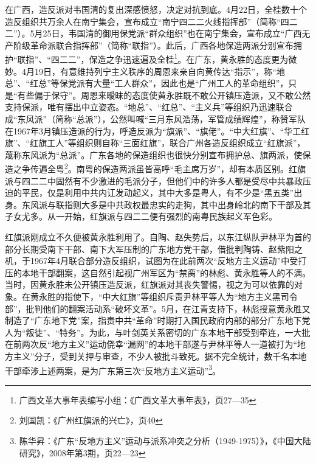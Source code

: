 在广西，造反派对韦国清的复出深感愤怒，决定对抗到底。4月22日，全桂数十个造反组织共万余人在南宁集会，宣布成立“南宁四二二火线指挥部”（简称“四二二”）。5月25日，韦国清的御用保党派“群众组织”也在南宁集会，宣布成立“广西无产阶级革命派联合指挥部”（简称“联指”）。此后，广西各地保造两派分别宣布拥护“联指”、“四二二”，保造之争迅速遍及全桂\footnote{广西文革大事年表编写小组：《广西文革大事年表》，页27—35}。在广东，黄永胜的态度更为微妙。4月19日，有意维持列宁主义秩序的周恩来亲自向黄传达“指示”，称“地总”、“红总”等保党派有大量“工人群众”，因此也是“广州工人的革命组织”，只是“有些偏于保守”。周恩来暧昧的态度使黄永胜既不敢公开镇压造派，又不敢公然支持保派，唯有摆出中立姿态。“地总”、“红总”、“主义兵”等组织乃迅速联合成“东风派”（简称“总派”），公然叫喊“三月东风浩荡，军管成绩辉煌”，称赞军队在1967年3月镇压造派的行为，呼造反派为“旗派”、“旗佬”。“中大红旗”、“华工红旗”、“红旗工人”等组织则自称“三面红旗”，联合广州各造反组织成立“红旗派”，蔑称东风派为“总派”。广东各地的保造组织也很快分别宣布拥护总、旗两派，使保造之争传遍全粤\footnote{刘国凯：《广州红旗派的兴亡》，页40}。南粤的保造两派虽皆高呼“毛主席万岁”，却有本质区别。红旗派与四二二中固然有不少激进的毛派分子，但他们中的许多人都是受尽中共暴政压迫的平民，仅是利用中共内讧发动起义，其中大多是粤人，有不少是“黑五类”出身。东风派与联指则大多是中共政权最忠实的走狗，其中出身岭北的南下干部及其子女尤多。从一开始，红旗派与四二二便有强烈的南粤民族起义军色彩。

红旗派刚成立不久便被黄永胜利用了。自陶、赵失势后，以东江纵队尹林平为首的部分长期受南下干部、南下大军压制的广东地方党干部，借批判陶铸、赵紫阳之机，于1967年4月联合部分造反组织，试图为在此前两次“反地方主义运动”中受打压的本地干部翻案，这自然引起视广州军区为“禁脔”的林彪、黄永胜等人的不满。当时，因黄永胜未公开镇压造反派，红旗派对其丧失警惕，视之为可以依靠的对象。在黄永胜的指使下，“中大红旗”等组织斥责尹林平等人为“地方主义黑司令部”，批判他们的翻案活动系“破坏文革”。5月，在江青支持下，林彪授意黄永胜又制造了“广东地下党”案，指责中共“革命”时期打入国民政府内部的部分广东地下党人为“叛徒”、“特务”。为此，与叶剑英关系密切的广东本地干部受到牵连，一大批在前两次反“地方主义”运动侥幸“漏网”的本地干部遂与尹林平等人一道被打为“地方主义”分子，受到关押与审查，不少人被批斗致死。据不完全统计，数千名本地干部牵涉上述两案，是为广东第三次“反地方主义运动”\footnote{陈华昇：《广东“反地方主义”运动与派系冲突之分析（1949-1975）》，《中国大陆研究》，2008年第3期，页22—23}。

